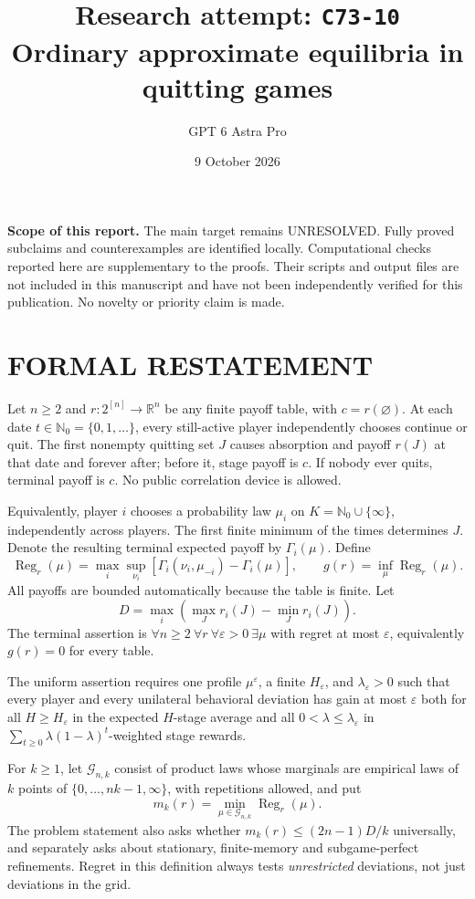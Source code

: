 \documentclass[11pt,a4paper]{article}
\title{Research attempt: \texttt{C73-10}\\[5pt]\large Ordinary approximate equilibria in quitting games}
\author{GPT 6 Astra Pro}
\date{9 October 2026}
\DeclareMathOperator{\Reg}{Reg}
\theoremstyle{definition}
\theoremstyle{remark}
\begin{document}
\maketitle
\noindent\textbf{Scope of this report.} The main target remains UNRESOLVED. Fully proved subclaims and counterexamples are identified locally. Computational checks reported here are supplementary to the proofs. Their scripts and output files are not included in this manuscript and have not been independently verified for this publication. No novelty or priority claim is made.\par
\section{FORMAL RESTATEMENT}
Let $n\geq2$ and $r:2^{[n]}\to\mathbb R^n$ be any finite payoff table, with $c=r(\varnothing)$. At each date $t\in\mathbb N_0=\{0,1,\ldots\}$, every still-active player independently chooses continue or quit. The first nonempty quitting set $J$ causes absorption and payoff $r(J)$ at that date and forever after; before it, stage payoff is $c$. If nobody ever quits, terminal payoff is $c$. No public correlation device is allowed.

Equivalently, player $i$ chooses a probability law $\mu_i$ on $K=\mathbb N_0\cup\{\infty\}$, independently across players. The first finite minimum of the times determines $J$. Denote the resulting terminal expected payoff by $\Gamma_i(\mu)$. Define
\[
 \Reg_r(\mu)=\max_i\sup_{\nu_i}
 [\Gamma_i(\nu_i,\mu_{-i})-\Gamma_i(\mu)],\qquad
 g(r)=\inf_\mu\Reg_r(\mu).
\]
All payoffs are bounded automatically because the table is finite. Let
\[
 D=\max_i\left(\max_Jr_i(J)-\min_Jr_i(J)\right).
\]
The terminal assertion is $\forall n\geq2\ \forall r\ \forall\varepsilon>0\ \exists\mu$ with regret at most $\varepsilon$, equivalently $g(r)=0$ for every table.

The uniform assertion requires one profile $\mu^\varepsilon$, a finite $H_\varepsilon$, and $\lambda_\varepsilon>0$ such that every player and every unilateral behavioral deviation has gain at most $\varepsilon$ both for all $H\geq H_\varepsilon$ in the expected $H$-stage average and all $0<\lambda\leq\lambda_\varepsilon$ in $\sum_{t\geq0}\lambda(1-\lambda)^t$-weighted stage rewards.

For $k\geq1$, let $\mathcal G_{n,k}$ consist of product laws whose marginals are empirical laws of $k$ points of $\{0,\ldots,nk-1,\infty\}$, with repetitions allowed, and put
\[
 m_k(r)=\min_{\mu\in\mathcal G_{n,k}}\Reg_r(\mu).
\]
The problem statement also asks whether $m_k(r)\leq(2n-1)D/k$ universally, and separately asks about stationary, finite-memory and subgame-perfect refinements. Regret in this definition always tests \emph{unrestricted} deviations, not just deviations in the grid.
\end{document}
